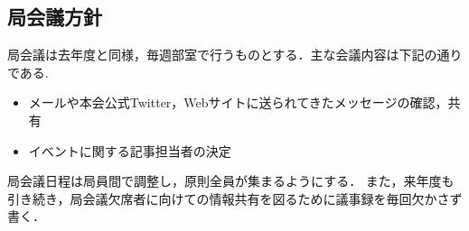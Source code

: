 \subsection*{局会議方針}


局会議は去年度と同様，毎週部室で行うものとする．主な会議内容は下記の通りである.
\begin{itemize}
  \item メールや本会公式Twitter，Webサイトに送られてきたメッセージの確認，共有
  \item イベントに関する記事担当者の決定
\end{itemize}

局会議日程は局員間で調整し，原則全員が集まるようにする．
また，来年度も引き続き，局会議欠席者に向けての情報共有を図るために議事録を毎回欠かさず書く．

